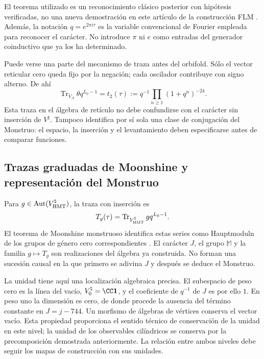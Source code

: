 El teorema utilizado es un reconocimiento clásico posterior con
hipótesis verificadas, no una nueva demostración en este artículo de
la construcción FLM \cite{flm}.
Además, la notación $q=e^{2\pi i\tau}$ es la variable convencional
de Fourier empleada para reconocer el carácter. No introduce $\pi$
ni $e$ como entradas del generador coinductivo que ya los ha determinado.

Puede verse una parte del mecanismo de traza antes del orbifold.
Sólo el vector reticular cero queda fijo por la negación; cada
oscilador contribuye con signo alterno. De ahí
\[
 \operatorname{Tr}_{V_\Lambda}\theta q^{L_0-1}
   =t_2(\tau)
   :=q^{-1}\prod_{n\geq1}(1+q^n)^{-24}.
\]
Esta traza en el álgebra de retículo no debe confundirse con el
carácter sin inserción de $V^\natural$. Tampoco identifica por sí
sola una clase de conjugación del Monstruo: el espacio, la inserción
y el levantamiento deben especificarse antes de comparar funciones.







\subsection{Trazas graduadas de Moonshine y representación del Monstruo}
\label{exc:alcance}

Para $g\in\operatorname{Aut}(V^\natural_{\rm HMT})$, la traza
con inserción es
\[
 T_g(\tau)=
 \operatorname{Tr}_{V^\natural_{\rm HMT}}gq^{L_0-1}.
\]
El teorema de Moonshine monstruoso identifica estas series como
Hauptmoduln de los grupos de género cero correspondientes
\cite[teorema~1.1]{borcherds}.
El carácter $J$, el grupo $\mathbb M$ y la familia $g\mapsto T_g$
son realizaciones del álgebra ya construida. No forman una sucesión
causal en la que primero se adivina $J$ y después se deduce el Monstruo.

La unidad tiene aquí una localización algebraica precisa. El subespacio
de peso cero es la línea del vacío, \(V^\natural_0=\CC\mathbf1\), y
el coeficiente de \(q^{-1}\) de \(J\) es por ello \(1\). En peso uno
la dimensión es cero, de donde procede la ausencia del término constante
en \(J=j-744\). Un morfismo de álgebras de vértices conserva el vector
vacío. Esta propiedad proporciona el sentido técnico de conservación
de la unidad en este nivel; la unidad de los observables cilíndricos
se conserva por la precomposición demostrada anteriormente. La relación
entre ambos niveles debe seguir los mapas de construcción con sus unidades.


